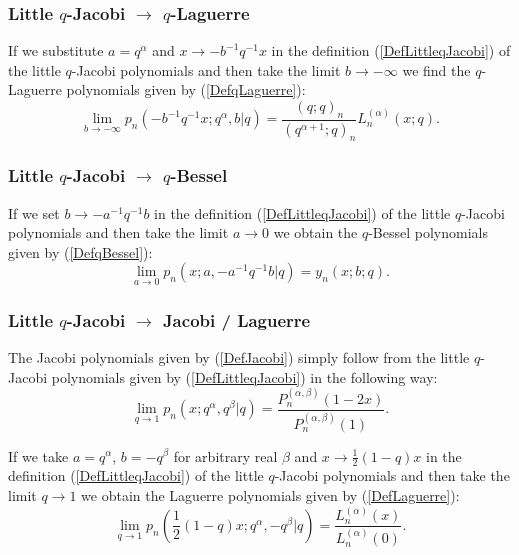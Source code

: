\documentclass[envcountchap,graybox]{svmono}
\newcounter{rom}
\begin{document}
\subsubsection*{Little $q$-Jacobi $\rightarrow$ $q$-Laguerre}
If we substitute $a=q^{\alpha}$ and $x\rightarrow -b^{-1}q^{-1}x$ in the definition
(\ref{DefLittleqJacobi}) of the little $q$-Jacobi polynomials and then take the limit
$b\rightarrow -\infty$ we find the $q$-Laguerre polynomials given by (\ref{DefqLaguerre}):
\begin{equation}
\lim_{b\rightarrow -\infty}p_n(-b^{-1}q^{-1}x;q^{\alpha},b|q)=
\frac{(q;q)_n}{(q^{\alpha+1};q)_n}L_n^{(\alpha)}(x;q).
\end{equation}

\subsubsection*{Little $q$-Jacobi $\rightarrow$ $q$-Bessel}
If we set $b\rightarrow -a^{-1}q^{-1}b$ in the definition (\ref{DefLittleqJacobi}) of
the little $q$-Jacobi polynomials and then take the limit $a\rightarrow 0$ we obtain
the $q$-Bessel polynomials given by (\ref{DefqBessel}):
\begin{equation}
\lim_{a\rightarrow 0}p_n(x;a,-a^{-1}q^{-1}b|q)=y_n(x;b;q).
\end{equation}

\subsubsection*{Little $q$-Jacobi $\rightarrow$ Jacobi / Laguerre}
The Jacobi polynomials given by (\ref{DefJacobi}) simply follow from
the little $q$-Jacobi polynomials given by (\ref{DefLittleqJacobi}) in the following way:
\begin{equation}
\lim_{q\rightarrow 1}p_n(x;q^{\alpha},q^{\beta}|q)=\frac{P_n^{(\alpha,\beta)}(1-2x)}
{P_n^{(\alpha,\beta)}(1)}.
\end{equation}

If we take $a=q^{\alpha}$, $b=-q^{\beta}$ for arbitrary real $\beta$ and
$x\rightarrow\frac{1}{2}(1-q)x$ in the definition (\ref{DefLittleqJacobi})
of the little $q$-Jacobi polynomials and then take the limit $q\rightarrow 1$
we obtain the Laguerre polynomials given by (\ref{DefLaguerre}):
\begin{equation}
\lim_{q\rightarrow 1}p_n(\textstyle\frac{1}{2}(1-q)x;q^{\alpha},-q^{\beta}|q)
=\frac{L_n^{(\alpha)}(x)}{L_n^{(\alpha)}(0)}.
\end{equation}
\end{document}
